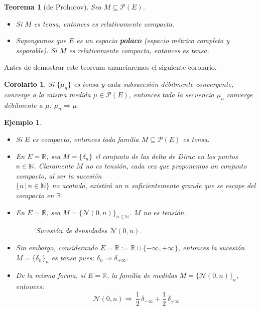 \documentclass[a4paper]{article}
\newtheorem{teorema}{Teorema}
\newtheorem{ejemplo}{Ejemplo}
\newtheorem{cor}{Corolario}
\numberwithin{equation}{subsection}
\def\R{\mathbb R}
\def\N{\mathbb N}
\begin{document}
\begin{teorema}[de Prohorov] Sea $M\subseteq \mathcal{P}(E)$.
\begin{itemize}
    \item[i)] Si $M$ es tensa, entonces es relativamente compacta.
    \item[ii)] Supongamos que $E$ es un espacio \textbf{polaco} (espacio métrico completo y separable). Si $M$ es relativamente compacta, entonces es tensa.
\end{itemize}
\end{teorema}
Antes de demostrar este teorema anunciaremos el siguiente corolario.

\begin{cor} Si $\{\mu_n\}$ es tensa y cada subsucesión débilmente convergente, converge a la misma medida $\mu\in\mathcal{P}(E)$, entonces toda la secuencia $\mu_n$ converge débilmente a $\mu$: $\mu_n \Rightarrow \mu$.
\end{cor}

\begin{ejemplo}
\begin{itemize}
    \item Si $E$ es compacto, entonces toda familia $M\subseteq \mathcal{P}(E)$ es tensa.
    \item En $E=\R$, sea $M=\{\delta_n \}$ el conjunto de las delta de Dirac en los puntos $n\in\N$. Claramente $M$ no es tensión, cada vez que proponemos un conjunto compacto, al ser la sucesión \\$\{n\,|\, n\in\N\}$ no acotada, existirá un $n$ suficientemente grande que se escape del compacto en $\R$. 
    \item En $E=\R$, sea $M=\{\mathcal{N}(0,n)\}_{n\in\N}$. $M$ no es tensión.
\newpage
\begin{figure}[h!]
\centering
    \caption{Sucesión de densidades $\mathcal{N}(0,n)$.}
\end{figure}

    \item Sin embargo, considerando $E=\overline{\R}:=\R\cup \{-\infty ,+\infty\}$, entonces la sucesión $M=\{\delta_n \}_n$ es tensa pues: $\delta_n \Rightarrow \delta_{+\infty}$.
    
    \item De la misma forma, si $E=\overline{\R}$, la familia de medidas $M=\{\mathcal{N}(0,n)\}_n$, entonces:
    \[\mathcal{N}(0,n) \Rightarrow\,\frac{1}{2}\,\delta_{-\infty} + \frac{1}{2}\,\delta_{+\infty}\]
\end{itemize}
\end{ejemplo}
\end{document}
